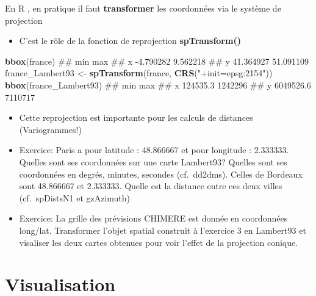 \documentclass[8pt,ignorenonframetext,]{beamer}
\newenvironment{Shaded}{\begin{snugshade}}{\end{snugshade}}
\newcommand{\KeywordTok}[1]{\textcolor[rgb]{0.13,0.29,0.53}{\textbf{{#1}}}}
\newcommand{\StringTok}[1]{\textcolor[rgb]{0.31,0.60,0.02}{{#1}}}
\newcommand{\NormalTok}[1]{{#1}}
\providecommand{\tightlist}{%
\setlength{\itemsep}{0pt}\setlength{\parskip}{0pt}}
\begin{document}
\begin{frame}[fragile]{En R , en pratique il faut \textbf{transformer}
les coordonnées via le système de projection}

\begin{itemize}
\tightlist
\item
  C'est le rôle de la fonction de reprojection \textbf{spTransform()}
\end{itemize}

\begin{Shaded}
\begin{Highlighting}[]
\KeywordTok{bbox}\NormalTok{(france)}
\NormalTok{##         min       max}
\NormalTok{## x -4.790282  9.562218}
\NormalTok{## y 41.364927 51.091109}
\NormalTok{france_Lambert93 <-}\StringTok{ }\KeywordTok{spTransform}\NormalTok{(france, }\KeywordTok{CRS}\NormalTok{(}\StringTok{"+init=epsg:2154"}\NormalTok{))}
\KeywordTok{bbox}\NormalTok{(france_Lambert93)}
\NormalTok{##         min     max}
\NormalTok{## x  124535.3 1242296}
\NormalTok{## y 6049526.6 7110717}
\end{Highlighting}
\end{Shaded}

\begin{itemize}
\item
  Cette reprojection est importante pour les calculs de distances
  (Variogrammes!)
\item
  Exercice: Paris a pour latitude : 48.866667 et pour longitude :
  2.333333. Quelles sont ses coordonnées sur une carte Lambert93?
  Quelles sont ses coordonnées en degrés, minutes, secondes
  (cf.~dd2dms). Celles de Bordeaux sont 48.866667 et 2.333333. Quelle
  est la distance entre ces deux villes (cf.~spDistsN1 et gzAzimuth)
\item
  Exercice: La grille des prévisions CHIMERE est donnée en coordonnées
  long/lat. Transformer l'objet spatial construit à l'exercice 3 en
  Lambert93 et visaliser les deux cartes obtenues pour voir l'effet de
  la projection conique.
\end{itemize}

\end{frame}

\section{Visualisation}\label{visualisation}
\end{document}
